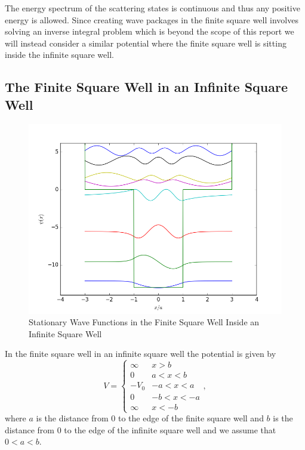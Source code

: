 \documentclass[12pt,a4paper]{article}
\begin{document}
The energy spectrum of the scattering states is continuous and thus any positive energy is allowed. Since creating wave packages in the finite square well involves solving an inverse integral problem which is beyond the scope of this report we will instead consider a similar potential where the finite square well is sitting inside the infinite square well.

\subsection{The Finite Square Well in an Infinite Square Well}
\begin{figure}
\includegraphics[width=\textwidth]{../Python/WiW_stationarySolutions.png}
\caption{Stationary Wave Functions in the Finite Square Well Inside an Infinite Square Well}
\label{fig:wellInWell}
\end{figure}

In the finite square well in an infinite square well the potential is given by
\begin{equation}
V = \begin{cases} \infty & x > b \\
                  0 & a < x < b \\
                  - V_0 & -a < x < a \\
                  0 & -b < x < -a \\
                  \infty & x < -b
\end{cases},
\end{equation}
where $a$ is the distance from $0$ to the edge of the finite square well and $b$ is the distance from $0$ to the edge of the infinite square well and we assume that $0 < a < b$.
\end{document}
